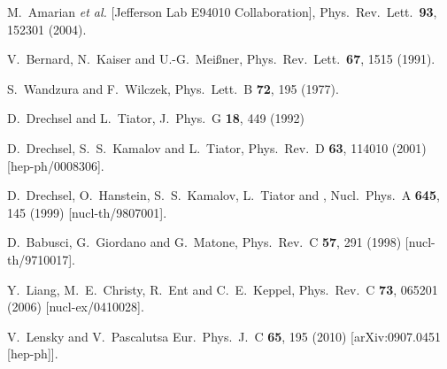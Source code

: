 \documentclass[twocolumn,prc,showpacs,nofootinbib,preprintnumbers,amsmath,amssymb,superscriptaddress]{revtex4-1}
\begin{document}
\begin{thebibliography}{99}
  M.~Amarian {\it et al.}  [Jefferson Lab E94010 Collaboration],
  Phys.\ Rev.\ Lett.\  {\bf 93}, 152301 (2004).



  
  
  V.~Bernard, N.~Kaiser and U.-G.~Mei\ss ner,
  Phys.\ Rev.\ Lett.\  {\bf 67}, 1515 (1991).



  S.~Wandzura and F.~Wilczek,
  Phys.\ Lett.\ B {\bf 72}, 195 (1977).




  D.~Drechsel and L.~Tiator,
  J.\ Phys.\ G {\bf 18}, 449 (1992)

  D.~Drechsel, S.~S.~Kamalov and L.~Tiator,
  Phys.\ Rev.\ D {\bf 63}, 114010 (2001)
  [hep-ph/0008306].
  
  D.~Drechsel, O.~Hanstein, S.~S.~Kamalov, L.~Tiator and ,
  Nucl.\ Phys.\ A {\bf 645}, 145 (1999)
  [nucl-th/9807001].

  D.~Babusci, G.~Giordano and G.~Matone,
  Phys.\ Rev.\ C {\bf 57}, 291 (1998)
  [nucl-th/9710017].
  
  Y.~Liang, M.~E.~Christy, R.~Ent and C.~E.~Keppel,
  Phys.\ Rev.\ C {\bf 73}, 065201 (2006)
  [nucl-ex/0410028].

  V.~Lensky and V.~Pascalutsa
  Eur.\ Phys.\ J.\ C {\bf 65}, 195 (2010)
  [arXiv:0907.0451 [hep-ph]].


\end{thebibliography}
\end{document}
